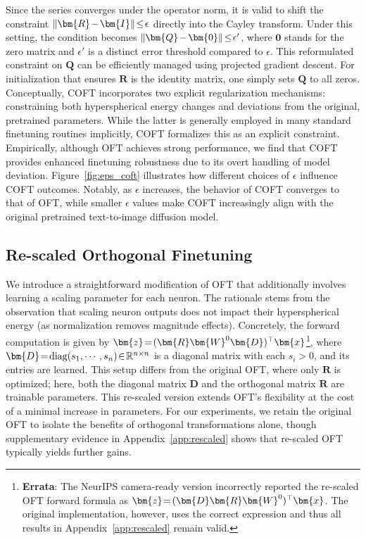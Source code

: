 Since the series converges under the operator norm, it is valid to shift the constraint $\thickmuskip=2mu \medmuskip=2mu\|\bm{R}-\bm{I}\|\leq\epsilon$ directly into the Cayley transform. Under this setting, the condition becomes $\thickmuskip=2mu \medmuskip=2mu \|\bm{Q}-\bm{0}\|\leq\epsilon'$, where $\bm{0}$ stands for the zero matrix and $\epsilon'$ is a distinct error threshold compared to $\epsilon$. This reformulated constraint on $\bm{Q}$ can be efficiently managed using projected gradient descent. For initialization that ensures $\bm{R}$ is the identity matrix, one simply sets $\bm{Q}$ to all zeros. Conceptually, COFT incorporates two explicit regularization mechanisms: constraining both hyperspherical energy changes and deviations from the original, pretrained parameters. While the latter is generally employed in many standard finetuning routines implicitly, COFT formalizes this as an explicit constraint. Empirically, although OFT achieves strong performance, we find that COFT provides enhanced finetuning robustness due to its overt handling of model deviation. Figure~\ref{fig:eps_coft} illustrates how different choices of $\epsilon$ influence COFT outcomes. Notably, as $\epsilon$ increases, the behavior of COFT converges to that of OFT, while smaller $\epsilon$ values make COFT increasingly align with the original pretrained text-to-image diffusion model.

\subsection{Re-scaled Orthogonal Finetuning}

We introduce a straightforward modification of OFT that additionally involves learning a scaling parameter for each neuron. The rationale stems from the observation that scaling neuron outputs does not impact their hyperspherical energy (as normalization removes magnitude effects). Concretely, the forward computation is given by $\thickmuskip=2mu \medmuskip=2mu\bm{z}=(\bm{R}\bm{W}^0\bm{D})^\top\bm{x}$\footnote{\textbf{Errata}: The NeurIPS camera-ready version incorrectly reported the re-scaled OFT forward formula as $\thickmuskip=2mu \medmuskip=2mu\bm{z}=(\bm{D}\bm{R}\bm{W}^0)^\top\bm{x}$. The original implementation, however, uses the correct expression and thus all results in Appendix~\ref{app:rescaled} remain valid.}, where $\thickmuskip=2mu \medmuskip=2mu \bm{D}=\text{diag}(s_1,\cdots,s_n)\in\mathbb{R}^{n\times n}$ is a diagonal matrix with each $s_i > 0$, and its entries are learned. This setup differs from the original OFT, where only $\bm{R}$ is optimized; here, both the diagonal matrix $\bm{D}$ and the orthogonal matrix $\bm{R}$ are trainable parameters. This re-scaled version extends OFT’s flexibility at the cost of a minimal increase in parameters. For our experiments, we retain the original OFT to isolate the benefits of orthogonal transformations alone, though supplementary evidence in Appendix~\ref{app:rescaled} shows that re-scaled OFT typically yields further gains.

